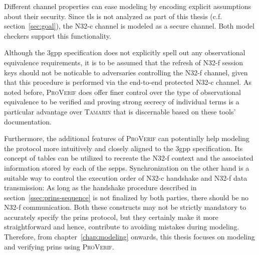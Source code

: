 Different channel properties can ease modeling by encoding explicit assumptions about their security.
Since \gls{tls} is not analyzed as part of this thesis (c.f. section~\ref{sec:goal}), the N32-c channel is modeled as a secure channel.
Both model checkers support this functionality.

Although the \gls{3gpp} specification does not explicitly spell out any observational equivalence requirements, it is to be assumed that the refresh of N32-f session keys should not be noticable to adversaries controlling the N32-f channel, given that this procedure is performed via the end-to-end protected N32-c channel.
As noted before, \textsc{ProVerif} does offer finer control over the type of observational equivalence to be verified and proving strong secrecy of individual terms is a particular advantage over \textsc{Tamarin} that is discernable based on these tools' documentation.

Furthermore, the additional features of \textsc{ProVerif} can potentially help modeling the protocol more intuitively and closely aligned to the \gls{3gpp} specification.
Its concept of tables can be utilized to recreate the N32-f context and the associated information stored by each of the \glspl{sepp}.
Synchronization on the other hand is a suitable way to control the execution order of \mbox{N32-c} handshake and N32-f data transmission:
As long as the handshake procedure described in section~\ref{ssec:prins-sequence} is not finalized by both parties, there should be no N32-f communication.
Both these constructs may not be strictly mandatory to accurately specify the \gls{prins} protocol, but they certainly make it more straightforward and hence, contribute to avoiding mistakes during modeling.
Therefore, from chapter~\ref{chap:modeling} onwards, this thesis focuses on modeling and verifying \gls{prins} using \textsc{ProVerif}.